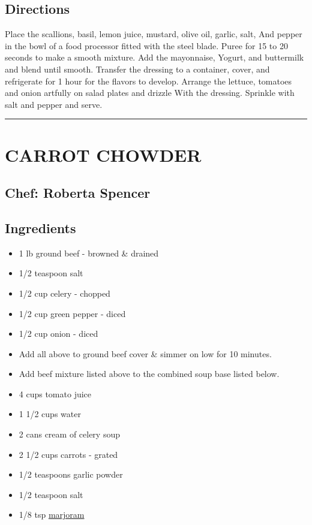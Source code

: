 \documentclass[
]{book}
\providecommand{\tightlist}{%
  \setlength{\itemsep}{0pt}\setlength{\parskip}{0pt}}
\begin{document}
\hypertarget{directions-16}{%
\subsection*{Directions}\label{directions-16}}


Place the scallions, basil, lemon juice, mustard, olive oil, garlic, salt,
And pepper in the bowl of a food processor fitted with the steel blade.
Puree for 15 to 20 seconds to make a smooth mixture. Add the mayonnaise,
Yogurt, and buttermilk and blend until smooth. Transfer the dressing to a
container, cover, and refrigerate for 1 hour for the flavors to develop.
Arrange the lettuce, tomatoes and onion artfully on salad plates and drizzle
With the dressing. Sprinkle with salt and pepper and serve.

\begin{center}\rule{0.5\linewidth}{0.5pt}\end{center}

\hypertarget{carrot-chowder}{%
\section*{CARROT CHOWDER}\label{carrot-chowder}}


\hypertarget{chef-roberta-spencer-2}{%
\subsection*{Chef: Roberta Spencer}\label{chef-roberta-spencer-2}}


\hypertarget{ingredients-17}{%
\subsection*{Ingredients}\label{ingredients-17}}


\begin{itemize}
\tightlist
\item
  1 lb ground beef - browned \& drained
\item
  1/2 teaspoon salt
\item
  1/2 cup celery - chopped
\item
  1/2 cup green pepper - diced
\item
  1/2 cup onion - diced
\item
  Add all above to ground beef cover \& simmer on low for 10 minutes.
\item
  Add beef mixture listed above to the combined soup base listed below.
\item
  4 cups tomato juice
\item
  1 1/2 cups water
\item
  2 cans cream of celery soup
\item
  2 1/2 cups carrots - grated
\item
  1/2 teaspoons garlic powder
\item
  1/2 teaspoon salt
\item
  1/8 tsp \href{https://en.wikipedia.org/wiki/Marjoram}{marjoram}
\end{itemize}
\end{document}
